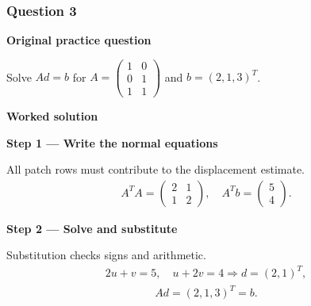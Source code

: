 \documentclass[letterpaper,11pt,english,openany,oneside]{jupyterBook}
\begin{document}
\subsubsection{Question 3}
\label{\detokenize{lectures/lecture05/tldr:question-3}}
\par\medskip\textbf{Original practice question}\par\smallskip

\sphinxAtStartPar
Solve \(Ad=b\) for \(A=\left(\begin{smallmatrix}1&0\\0&1\\1&1\end{smallmatrix}\right)\) and \(b=(2,1,3)^T\).

\par\medskip

\par\medskip
\textbf{Worked solution}\par\smallskip

\par\medskip{}
{\color{QuizStepRed}\bfseries Step 1 — Write the normal equations}\par\smallskip

\sphinxAtStartPar
{} All patch rows must contribute to the displacement estimate.
{\color{QuizMathBlue} \begin{equation*}
\begin{split}A^TA=\begin{pmatrix}2&1\\1&2\end{pmatrix},\quad A^Tb=\begin{pmatrix}5\\4\end{pmatrix}.\end{split}
\end{equation*}}
\par

\par\medskip{}
{\color{QuizStepRed}\bfseries Step 2 — Solve and substitute}\par\smallskip

\sphinxAtStartPar
{} Substitution checks signs and arithmetic.
{\color{QuizMathBlue} \begin{equation*}
\begin{split}2u+v=5,\quad u+2v=4\Rightarrow d=(2,1)^T,\end{split}
\end{equation*}}{\color{QuizMathBlue} \begin{equation*}
\begin{split}Ad=(2,1,3)^T=b.\end{split}
\end{equation*}}
\par
\end{document}
